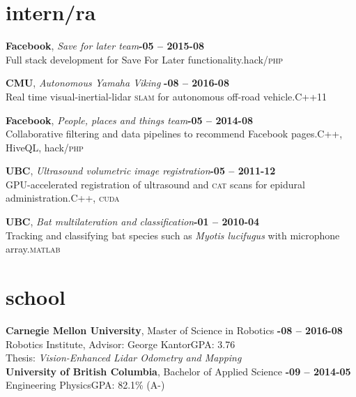 \documentclass[margin,10pt]{res}
\begin{document}
\begin{resume}
\section{\sc \lsstyle intern/ra}
    \textbf{Facebook}, \textit{Save for later team}\hfill \textsc{\bfseries{}-05 -- 2015-08}\\
    Full stack development for Save For Later functionality.\hfill hack/\textsc{php}

    \textbf{CMU}, \textit{Autonomous Yamaha Viking} \hfill \textsc{\bfseries{}-08 -- 2016-08}\\
    Real time visual-inertial-lidar \textsc{slam} for autonomous off-road vehicle.\hfill C++11

    \textbf{Facebook}, \textit{People, places and things team}\hfill \textsc{\bfseries{}-05 -- 2014-08}\\
    Collaborative filtering and data pipelines to recommend Facebook pages.\hfill C++, HiveQL, hack/\textsc{php}

    \textbf{UBC}, \textit{Ultrasound volumetric image registration}\hfill \textsc{\bfseries{}-05 -- 2011-12}\\
    GPU-accelerated registration of ultrasound and \textsc{cat} scans for epidural administration.\hfill C++, \textsc{cuda}

    \textbf{UBC}, \textit{Bat multilateration and classification}\hfill \textsc{\bfseries{}-01 -- 2010-04}\\
    Tracking and classifying bat species such as {\em Myotis lucifugus} with microphone array.\hfill \textsc{matlab}

\section{\sc \lsstyle school}
    \textbf{Carnegie Mellon University}, Master of Science in Robotics \hfill \textsc{\bfseries{}-08 -- 2016-08}\\
    Robotics Institute, Advisor: George Kantor\hfill GPA: 3.76\\
    Thesis: \textit{Vision-Enhanced Lidar Odometry and Mapping}\vspace{3pt}\\
    \textbf{University of British Columbia}, Bachelor of Applied Science \hfill \textsc{\bfseries{}-09 -- 2014-05}\\
    Engineering Physics\hfill GPA: 82.1\% (A-)%

\end{resume}
\end{document}
